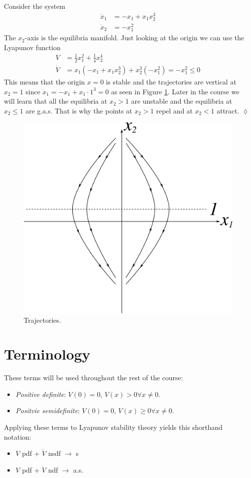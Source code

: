 \begin{example}
Consider the system
\begin{align}
\label{eq:lec08ex3}
\dot{x}_1 &= -x_1 + x_1x_2^3 \\
\label{eq:lec08ex4}
\dot{x}_2 &= -x_1^2
\end{align}
The $x_2$-axis is the equilibria manifold. Just looking at the origin we can use the Lyapunov function
\begin{align*}
V &= \tfrac{1}{2}x_1^2 + \tfrac{1}{4}x_2^4 \\
\dot{V} &= x_1(-x_1+x_1x_2^3) + x_2^3(-x_1^2) = -x_1^2 \leq 0
\end{align*}
This means that the origin $x=0$ is stable and the trajectories  are vertical at $x_2=1$ since $\dot{x}_1=-x_1+x_1\cdot 1^3 = 0$ as seen in Figure \ref{fig:08trajectories}. Later in the course we will learn that all the equilibria at $x_2>1$ are unstable and the equilibria at $x_2\leq1$ are g.a.s. That is why the points at $x_2>1$ repel and at $x_2<1$ attract.
$\lozenge$
\end{example}

\begin{figure}[ht!]
	\centering
	\includegraphics[width=.4\textwidth]{images/08trajectories}
	\caption{Trajectories.}
	\label{fig:08trajectories}
\end{figure}

\section{Terminology}
These terms will be used throughout the rest of the course:
\begin{itemize}
\item \textit{Positive definite}: $V(0)=0$, $V(x)>0\forall x \neq0$.
\item \textit{Positvie semidefinite}: $V(0)=0$, $V(x)\geq0 \forall x \neq0$.
\end{itemize}

Applying these terms to Lyapunov stability theory yields this shorthand notation:
\begin{itemize}
\item $V$ pdf + $\dot{V}$ nsdf $\to$ s
\item $V$ pdf + $\dot{V}$ ndf $\to$ a.s.
\end{itemize}

